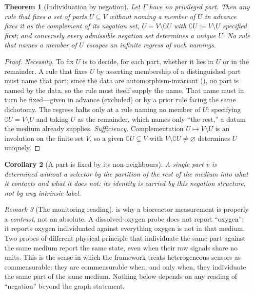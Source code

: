 \documentclass[11pt,twocolumn,a4paper]{article}
\theoremstyle{thmstyle}
\newtheorem{theorem}{Theorem}[section]
\newtheorem{corollary}[theorem]{Corollary}
\theoremstyle{definition}
\theoremstyle{remark}
\newtheorem{remark}[theorem]{Remark}
\newcommand{\co}{\complement}
\newcommand{\Gph}{\Gamma}
\newcommand{\V}{V}
\begin{document}
\begin{theorem}[Individuation by negation]
\label{thm:negation}
Let $\Gph$ have no privileged part. Then any rule that fixes a set of parts
$U\subseteq\V$ without naming a member of $U$ in advance fixes it as the
complement of its negation set, $U=\V\setminus\co U$ with $\co U:=\V\setminus
U$ specified first; and conversely every admissible negation set determines
a unique $U$. No rule that names a member of $U$ escapes an infinite
regress of such namings.
\end{theorem}

\begin{proof}
\emph{Necessity.} To fix $U$ is to decide, for each part, whether it lies
in $U$ or in the remainder. A rule that fixes $U$ by asserting membership
of a distinguished part must name that part; since the data are
automorphism-invariant (), no part is named by the
data, so the rule must itself supply the name. That name must in turn be
fixed---given in advance (excluded) or by a prior rule facing the same
dichotomy. The regress halts only at a rule naming no member of $U$:
specifying $\co U=\V\setminus U$ and taking $U$ as the remainder, which
names only ``the rest,'' a datum the medium already supplies.
\emph{Sufficiency.} Complementation $U\mapsto\V\setminus U$ is an
involution on the finite set $\V$, so a given $\co U\subsetneq\V$ with
$\V\setminus\co U\neq\varnothing$ determines $U$ uniquely.
\end{proof}

\begin{corollary}[A part is fixed by its non-neighbours]
\label{cor:nonneighbours}
A single part $v$ is determined without a selector by the partition of the
rest of the medium into what it contacts and what it does not: its identity
is carried by this negation structure, not by any intrinsic label.
\end{corollary}

\begin{remark}[The monitoring reading]
\label{rem:monitoring-negation}
 is why a bioreactor measurement is properly a
\emph{contrast}, not an absolute. A dissolved-oxygen probe does not report
``oxygen''; it reports oxygen individuated against everything oxygen is not
in that medium. Two probes of different physical principle that individuate
the same part against the same medium report the same state, even when
their raw signals share no units. This is the sense in which the framework
treats heterogeneous sensors as commensurable: they are commensurable when,
and only when, they individuate the same part of the same medium. Nothing
below depends on any reading of ``negation'' beyond the graph statement.
\end{remark}
\end{document}

